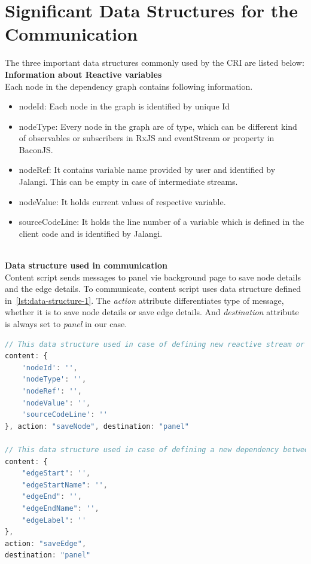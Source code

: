 \section{Significant Data Structures for the Communication}
The three important data structures commonly used by the CRI are listed below:
\\
\textbf{Information about Reactive variables }
\\
Each node in the dependency graph contains following information.
\begin{itemize}
	\item nodeId: Each node in the graph is identified by unique Id
	\item nodeType: Every node in the graph are of type, which can be different kind of observables or subscribers in RxJS and eventStream or property in BaconJS.
	\item nodeRef: It contains variable name provided by user and identified by Jalangi. This can be empty in case of intermediate streams.
	\item nodeValue: It holds current values of respective variable.
	\item sourceCodeLine: It holds the line number of a variable which is defined in the client code and is identified by Jalangi.
\end{itemize}
\leavevmode
\\
\textbf{Data structure used in communication}
\\
Content script sends messages to panel vie background page to save node details and the edge details. To communicate, content script uses data structure defined in~\ref{lst:data-structure-1}. The \textit{action} attribute differentiates type of message, whether it is to save node details or save edge details. And \textit{destination} attribute is always set to \textit{panel} in our case.

\begin{lstlisting}[language=JavaScript, caption=Data structure for communication, label={lst:data-structure-1}]
// This data structure used in case of defining new reactive stream or updating the existing ones with new nodeValue
content: {
	'nodeId': '',
	'nodeType': '',
	'nodeRef': '',
	'nodeValue': '',
	'sourceCodeLine': ''
}, action: "saveNode", destination: "panel"

// This data structure used in case of defining a new dependency between two reactive streams
content: {
	"edgeStart": '',
	"edgeStartName": '',
	"edgeEnd": '',
	"edgeEndName": '',
	"edgeLabel": ''
},
action: "saveEdge",
destination: "panel"

\end{lstlisting}

